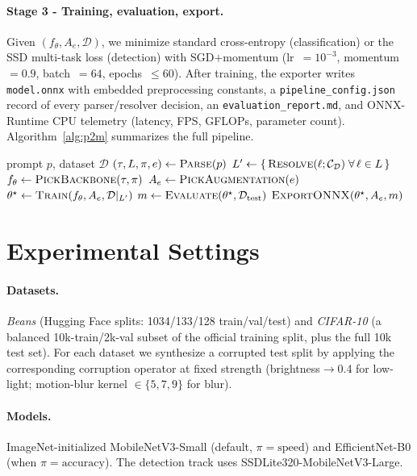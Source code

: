 \documentclass[10pt,twocolumn,letterpaper]{article}
\begin{document}
\paragraph{Stage 3 - Training, evaluation, export.}
Given $(f_\theta, A_e, \mathcal{D})$, we minimize standard
cross-entropy (classification) or the SSD multi-task loss (detection)
with SGD$+$momentum (lr~$=10^{-3}$, momentum~$=0.9$, batch~$=64$,
epochs~$\le 60$). After training, the exporter writes
\texttt{model.onnx} with embedded preprocessing constants, a
\texttt{pipeline\_config.json} record of every parser/resolver
decision, an \texttt{evaluation\_report.md}, and ONNX-Runtime CPU
telemetry (latency, FPS, GFLOPs, parameter count).
Algorithm~\ref{alg:p2m} summarizes the full pipeline.

\begin{algorithm}[t]
    \small
    \caption{Prompt2Model compilation}
    \label{alg:p2m}
    \begin{algorithmic}[1]
        \Require prompt $p$, dataset $\mathcal{D}$
        \State $(\tau, L, \pi, e)\gets \textsc{Parse}(p)$
        \State $L'\gets \{\,\textsc{Resolve}(\ell;\mathcal{C}_\mathcal{D})\;\forall\,\ell\in L\,\}$
        \State $f_\theta\gets \textsc{PickBackbone}(\tau,\pi)$
        \State $A_e\gets \textsc{PickAugmentation}(e)$
        \State $\theta^\star\gets \textsc{Train}(f_\theta, A_e, \mathcal{D}|_{L'})$
        \State $m\gets \textsc{Evaluate}(\theta^\star, \mathcal{D}_\text{test})$
        \State $\textsc{ExportONNX}(\theta^\star, A_e, m)$
    \end{algorithmic}
\end{algorithm}

\section{Experimental Settings}
\paragraph{Datasets.} \emph{Beans} (Hugging Face splits:
1034/133/128 train/val/test) and \emph{CIFAR-10} (a balanced
10k-train/2k-val subset of the official training split, plus the full
10k test set). For each dataset we synthesize a corrupted test split
by applying the corresponding corruption operator at fixed strength
(brightness$\to$0.4 for low-light; motion-blur kernel
$\in\{5,7,9\}$ for blur).
\paragraph{Models.} ImageNet-initialized MobileNetV3-Small (default,
$\pi=\text{speed}$) and EfficientNet-B0 (when $\pi=\text{accuracy}$).
The detection track uses SSDLite320-MobileNetV3-Large.
\end{document}
